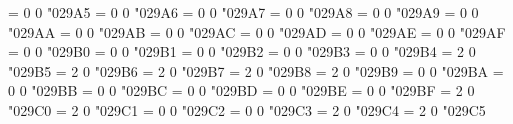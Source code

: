 \Umathchardef\revangleubar = 0 0 "029A5 %
\Umathchardef\wideangledown = 0 0 "029A6 %
\Umathchardef\wideangleup = 0 0 "029A7 %
\Umathchardef\measanglerutone = 0 0 "029A8 %
\Umathchardef\measanglelutonw = 0 0 "029A9 %
\Umathchardef\measanglerdtose = 0 0 "029AA %
\Umathchardef\measangleldtosw = 0 0 "029AB %
\Umathchardef\measangleurtone = 0 0 "029AC %
\Umathchardef\measangleultonw = 0 0 "029AD %
\Umathchardef\measangledrtose = 0 0 "029AE %
\Umathchardef\measangledltosw = 0 0 "029AF %
\Umathchardef\revemptyset = 0 0 "029B0 %
\Umathchardef\emptysetobar = 0 0 "029B1 %
\Umathchardef\emptysetocirc = 0 0 "029B2 %
\Umathchardef\emptysetoarr = 0 0 "029B3 %
\Umathchardef\emptysetoarrl = 0 0 "029B4 %
\Umathchardef\circlehbar = 2 0 "029B5 %
\Umathchardef\circledvert = 2 0 "029B6 %
\Umathchardef\circledparallel = 2 0 "029B7 %
\Umathchardef\obslash = 2 0 "029B8 %
\Umathchardef\operp = 2 0 "029B9 %
\Umathchardef\obot = 0 0 "029BA %
\Umathchardef\olcross = 0 0 "029BB %
\Umathchardef\odotslashdot = 0 0 "029BC %
\Umathchardef\uparrowoncircle = 0 0 "029BD %
\Umathchardef\circledwhitebullet = 0 0 "029BE %
\Umathchardef\circledbullet = 0 0 "029BF %
\Umathchardef\olessthan = 2 0 "029C0 %
\Umathchardef\ogreaterthan = 2 0 "029C1 %
\Umathchardef\cirscir = 0 0 "029C2 %
\Umathchardef\cirE = 0 0 "029C3 %
\Umathchardef\boxdiag = 2 0 "029C4 %
\Umathchardef\boxbslash = 2 0 "029C5 %
